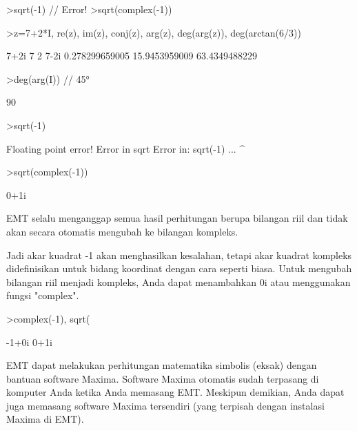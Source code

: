\documentclass[a4paper,10pt]{article}
\begin{document}
\begin{eulernotebook}
\begin{eulercomment}
\begin{eulercomment}
\begin{eulercomment}
\begin{eulercomment}
\begin{eulercomment}
\end{eulercomment}
\begin{eulerttcomment}
  >sqrt(-1) // Error!
  >sqrt(complex(-1))
\end{eulerttcomment}
\begin{eulerprompt}
>z=7+2*I, re(z), im(z), conj(z), arg(z), deg(arg(z)), deg(arctan(6/3))
\end{eulerprompt}
\begin{euleroutput}
  7+2i
  7
  2
  7-2i
  0.278299659005
  15.9453959009
  63.4349488229
\end{euleroutput}
\begin{eulerprompt}
>deg(arg(I)) // 45°
\end{eulerprompt}
\begin{euleroutput}
  90
\end{euleroutput}
\begin{eulerprompt}
>sqrt(-1)
\end{eulerprompt}
\begin{euleroutput}
  Floating point error!
  Error in sqrt
  Error in:
  sqrt(-1) ...
          ^
\end{euleroutput}
\begin{eulerprompt}
>sqrt(complex(-1))
\end{eulerprompt}
\begin{euleroutput}
  0+1i
\end{euleroutput}
\begin{eulercomment}
EMT selalu menganggap semua hasil perhitungan berupa bilangan riil dan tidak
akan secara otomatis mengubah ke bilangan kompleks.

Jadi akar kuadrat -1 akan menghasilkan kesalahan, tetapi akar kuadrat kompleks
didefinisikan untuk bidang koordinat dengan cara seperti biasa. Untuk mengubah
bilangan riil menjadi kompleks, Anda dapat menambahkan 0i atau menggunakan
fungsi "complex".
\end{eulercomment}
\begin{eulerprompt}
>complex(-1), sqrt(%
\end{eulerprompt}
\begin{euleroutput}
  -1+0i 
  0+1i
\end{euleroutput}
\begin{eulercomment}
EMT dapat melakukan perhitungan matematika simbolis (eksak) dengan bantuan
software Maxima. Software Maxima otomatis sudah terpasang di komputer Anda ketika
Anda memasang EMT. Meskipun demikian, Anda dapat juga memasang software Maxima
tersendiri (yang terpisah dengan instalasi Maxima di EMT).


\end{eulercomment}
\end{eulercomment}
\end{eulercomment}
\end{eulercomment}
\end{eulercomment}
\end{eulernotebook}
\end{document}

